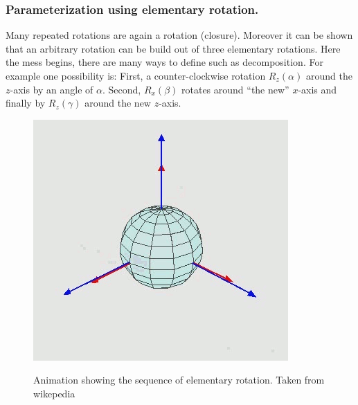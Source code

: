 \documentclass[
  letterpaper,
  DIV=11,
  numbers=noendperiod]{scrartcl}
\begin{document}
\begin{tcolorbox}[enhanced jigsaw, opacitybacktitle=0.6, rightrule=.15mm, breakable, bottomtitle=1mm, arc=.35mm, colframe=quarto-callout-important-color-frame, coltitle=black, leftrule=.75mm, title=\textcolor{quarto-callout-important-color}{\faExclamation}\hspace{0.5em}{We use body to lab rotations in this text.}, left=2mm, toptitle=1mm, colbacktitle=quarto-callout-important-color!10!white, titlerule=0mm, colback=white, bottomrule=.15mm, toprule=.15mm, opacityback=0]

\end{tcolorbox}

\hypertarget{parameterization-using-elementary-rotation.}{%
\subsubsection{Parameterization using elementary
rotation.}\label{parameterization-using-elementary-rotation.}}

Many repeated rotations are again a rotation (closure). Moreover it can
be shown that an arbitrary rotation can be build out of three elementary
rotations. Here the mess begins, there are many ways to define such as
decomposition. For example one possibility is: First, a
counter-clockwise rotation \(R_z(\alpha)\) around the \(z\)-axis by an
angle of \(\alpha\). Second, \(R_x(\beta)\) rotates around ``the new''
\(x\)-axis and finally by \(R_z(\gamma)\) around the new \(z\)-axis.

\begin{figure}

{\centering 

\href{https://en.wikipedia.org/wiki/Euler_angles}{\includegraphics{images/Euler2a.gif}}

}

\caption{\label{fig-rot-ball}Animation showing the sequence of
elementary rotation. Taken from wikepedia}

\end{figure}
\end{document}
